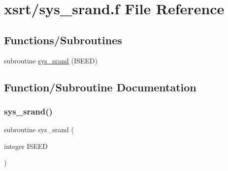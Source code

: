 \hypertarget{sys__srand_8f}{}\section{xsrt/sys\+\_\+srand.f File Reference}
\label{sys__srand_8f}
\subsection*{Functions/\+Subroutines}
\begin{DoxyCompactItemize}
\item 
subroutine \hyperlink{sys__srand_8f_a8dae03329331024b5ea40d66366c7b6d}{sys\+\_\+srand} (I\+S\+E\+ED)
\end{DoxyCompactItemize}


\subsection{Function/\+Subroutine Documentation}
\mbox{\label{sys__srand_8f_a8dae03329331024b5ea40d66366c7b6d}} 
\subsubsection{\texorpdfstring{sys\+\_\+srand()}{sys\_srand()}}
{\footnotesize\ttfamily subroutine sys\+\_\+srand (\begin{DoxyParamCaption}\item[{integer}]{I\+S\+E\+ED }\end{DoxyParamCaption})}

